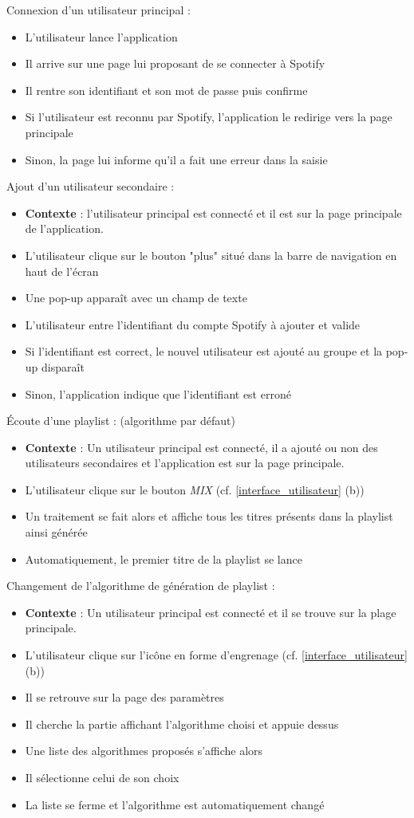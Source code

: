 \documentclass{article}
\begin{document}
        \noindent Connexion d'un utilisateur principal :
		\begin{itemize}
			\item L'utilisateur lance l'application
			\item Il arrive sur une page lui proposant de se connecter à Spotify
			\item Il rentre son identifiant et son mot de passe puis confirme
			\item Si l'utilisateur est reconnu par Spotify, l'application le redirige vers la page principale
			\item Sinon, la page lui informe qu'il a fait une erreur dans la saisie
		\end{itemize}
		Ajout d'un utilisateur secondaire :
		\begin{itemize}
			\item[] \textbf{Contexte} : l'utilisateur principal est connecté et il est sur la page principale de l'application.
			\item L'utilisateur clique sur le bouton "plus" situé dans la barre de navigation en haut de l'écran
			\item Une pop-up apparaît avec un champ de texte
			\item L'utilisateur entre l'identifiant du compte Spotify à ajouter et valide
			\item Si l'identifiant est correct, le nouvel utilisateur est ajouté au groupe et la pop-up disparaît
			\item Sinon, l'application indique que l'identifiant est erroné
		\end{itemize}
		Écoute d'une playlist : (algorithme par défaut)
		\begin{itemize}
			\item[] \textbf{Contexte} : Un utilisateur principal est connecté, il a ajouté ou non des utilisateurs secondaires et l'application est sur la page principale.
			\item L'utilisateur clique sur le bouton \textit{MIX} (cf. \ref{interface_utilisateur} (b))
			\item Un traitement se fait alors et affiche tous les titres présents dans la playlist ainsi générée
			\item Automatiquement, le premier titre de la playlist se lance
		\end{itemize}
		Changement de l'algorithme de génération de playlist :
		\begin{itemize}
			\item[] \textbf{Contexte} : Un utilisateur principal est connecté et il se trouve sur la plage principale.
			\item L'utilisateur clique sur l'icône en forme d'engrenage (cf. \ref{interface_utilisateur} (b))
			\item Il se retrouve sur la page des paramètres
			\item Il cherche la partie affichant l'algorithme choisi et appuie dessus
			\item Une liste des algorithmes proposés s'affiche alors
			\item Il sélectionne celui de son choix
			\item La liste se ferme et l'algorithme est automatiquement changé
		\end{itemize}
\end{document}
